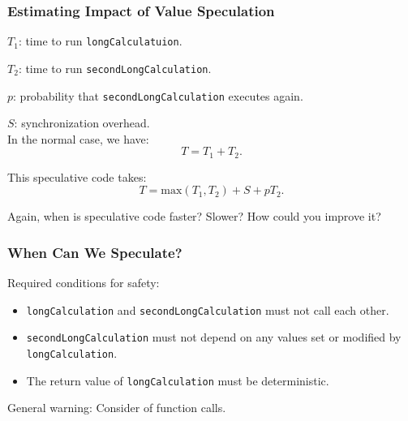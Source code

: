 \begin{frame}
  \frametitle{Estimating Impact of Value Speculation}

  
  $T_1$: time to run {\tt longCalculatuion}.

  $T_2$: time to run {\tt secondLongCalculation}.

  $p$: probability that {\tt secondLongCalculation} executes again.

  $S$: synchronization overhead.\\[1em]

  In the normal case, we have:
    \[ T = T_1 +T_2.\]

  This speculative code takes:
    \[ T = \mbox{max}(T_1, T_2) + S + pT_2.\]

     Again, when is speculative code faster? Slower? How could you improve it?

  
\end{frame}

\begin{frame}
  \frametitle{When Can We Speculate?}

  
  Required conditions for safety:

  \begin{itemize}
    \item {\tt longCalculation} and {\tt secondLongCalculation} must not call
      each other.
    \item {\tt secondLongCalculation} must not depend on
      any values set or modified by {\tt longCalculation}.
    \item The return value of {\tt longCalculation} must be deterministic.
  \end{itemize}

  General warning: Consider  of function calls.
  
\end{frame}



